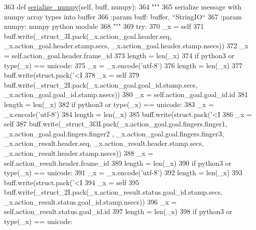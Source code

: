 \begin{DoxyCode}
363   \textcolor{keyword}{def }\hyperlink{classjaco__msgs_1_1msg_1_1__SetFingersPositionAction_1_1SetFingersPositionAction_aa1fa7fa0fb7bfa49ee98b481617e860c}{serialize\_numpy}(self, buff, numpy):
364     \textcolor{stringliteral}{"""}
365 \textcolor{stringliteral}{    serialize message with numpy array types into buffer}
366 \textcolor{stringliteral}{    :param buff: buffer, ``StringIO``}
367 \textcolor{stringliteral}{    :param numpy: numpy python module}
368 \textcolor{stringliteral}{    """}
369     \textcolor{keywordflow}{try}:
370       \_x = self
371       buff.write(\_struct\_3I.pack(\_x.action\_goal.header.seq, \_x.action\_goal.header.stamp.secs, 
      \_x.action\_goal.header.stamp.nsecs))
372       \_x = self.action\_goal.header.frame\_id
373       length = len(\_x)
374       \textcolor{keywordflow}{if} python3 \textcolor{keywordflow}{or} type(\_x) == unicode:
375         \_x = \_x.encode(\textcolor{stringliteral}{'utf-8'})
376         length = len(\_x)
377       buff.write(struct.pack(\textcolor{stringliteral}{'<I%
378       \_x = self
379       buff.write(\_struct\_2I.pack(\_x.action\_goal.goal\_id.stamp.secs, \_x.action\_goal.goal\_id.stamp.nsecs))
380       \_x = self.action\_goal.goal\_id.id
381       length = len(\_x)
382       \textcolor{keywordflow}{if} python3 \textcolor{keywordflow}{or} type(\_x) == unicode:
383         \_x = \_x.encode(\textcolor{stringliteral}{'utf-8'})
384         length = len(\_x)
385       buff.write(struct.pack(\textcolor{stringliteral}{'<I%
386       \_x = self
387       buff.write(\_struct\_3f3I.pack(\_x.action\_goal.goal.fingers.finger1, \_x.action\_goal.goal.fingers.finger2
      , \_x.action\_goal.goal.fingers.finger3, \_x.action\_result.header.seq, \_x.action\_result.header.stamp.secs, 
      \_x.action\_result.header.stamp.nsecs))
388       \_x = self.action\_result.header.frame\_id
389       length = len(\_x)
390       \textcolor{keywordflow}{if} python3 \textcolor{keywordflow}{or} type(\_x) == unicode:
391         \_x = \_x.encode(\textcolor{stringliteral}{'utf-8'})
392         length = len(\_x)
393       buff.write(struct.pack(\textcolor{stringliteral}{'<I%
394       \_x = self
395       buff.write(\_struct\_2I.pack(\_x.action\_result.status.goal\_id.stamp.secs, 
      \_x.action\_result.status.goal\_id.stamp.nsecs))
396       \_x = self.action\_result.status.goal\_id.id
397       length = len(\_x)
398       \textcolor{keywordflow}{if} python3 \textcolor{keywordflow}{or} type(\_x) == unicode:
}}}
\end{DoxyCode}
